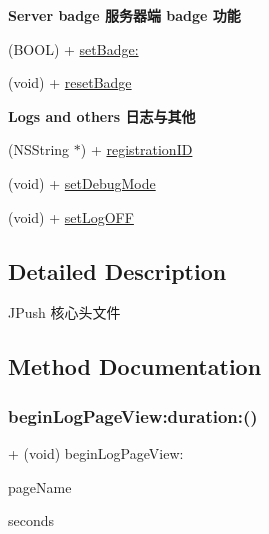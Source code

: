 \begin{Indent}\textbf{ Server badge 服务器端 badge 功能}\par
{\em 

 

 }\begin{DoxyCompactItemize}
\item 
(B\+O\+OL) + \mbox{\hyperlink{interface_j_p_u_s_h_service_a3d77239b5fc4483e4dd6bfbf312d98d3}{set\+Badge\+:}}
\item 
(void) + \mbox{\hyperlink{interface_j_p_u_s_h_service_acedc38cd5a3960208bf4338525c679c9}{reset\+Badge}}
\end{DoxyCompactItemize}
\end{Indent}
\begin{Indent}\textbf{ Logs and others 日志与其他}\par
{\em 

 

 }\begin{DoxyCompactItemize}
\item 
(N\+S\+String $\ast$) + \mbox{\hyperlink{interface_j_p_u_s_h_service_aaf7a20d918b1518f605c581d83e2c968}{registration\+ID}}
\item 
(void) + \mbox{\hyperlink{interface_j_p_u_s_h_service_a7bf32721e896ecd7070c85cdd709a957}{set\+Debug\+Mode}}
\item 
(void) + \mbox{\hyperlink{interface_j_p_u_s_h_service_a5e6a84cfe4e196798cc2af81eee2ec22}{set\+Log\+O\+FF}}
\end{DoxyCompactItemize}
\end{Indent}


\subsection{Detailed Description}
J\+Push 核心头文件 

\subsection{Method Documentation}
\mbox{\label{interface_j_p_u_s_h_service_a3460a947b8d147f41c9942e1f2dc0288}} 
\subsubsection{\texorpdfstring{begin\+Log\+Page\+View\+:duration\+:()}{beginLogPageView:duration:()}}
{\footnotesize\ttfamily + (void) begin\+Log\+Page\+View\+: \begin{DoxyParamCaption}\item[{(N\+S\+String $\ast$)}]{page\+Name }\item[{duration:(int)}]{seconds }\end{DoxyParamCaption}}


